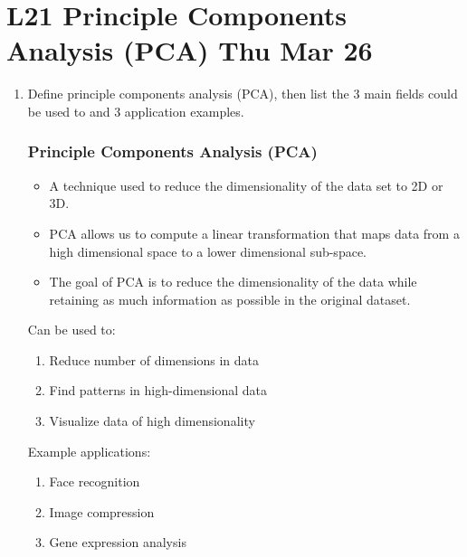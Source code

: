 \documentclass[12pt]{article}
\newenvironment{QandA}{\begin{enumerate}[label=\bfseries\arabic*.]\bfseries}
{\end{enumerate}}
\newenvironment{answered}{\par\normalfont\color{Sepia}}{}
\begin{document}
\section*{L21 Principle Components Analysis (PCA) \textemdash{} Thu Mar 26}
\begin{QandA}
    \item Define principle components analysis (PCA), then list the 3 main fields could be used to and 3 application examples.
    \begin{answered}
        \subsubsection*{Principle Components Analysis (PCA)}
        \begin{itemize}
            \item A technique used to reduce the dimensionality of the data set to 2D or 3D.
            \item PCA allows us to compute a linear transformation that maps data from a high dimensional space to a lower dimensional sub-space.
            \item The goal of PCA is to reduce the dimensionality of the data while retaining as much information as possible in the original dataset.
        \end{itemize}
        Can be used to:
        \begin{enumerate}
            \item Reduce number of dimensions in data
            \item Find patterns in high-dimensional data
            \item Visualize data of high dimensionality
        \end{enumerate}
        Example applications:
        \begin{enumerate}
            \item Face recognition
            \item Image compression
            \item Gene expression analysis
        \end{enumerate}
    \end{answered}


\end{QandA}
\end{document}
